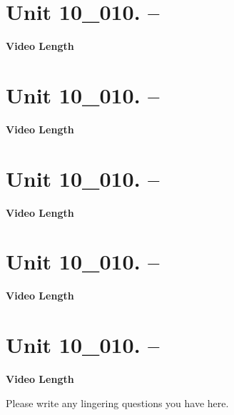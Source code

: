 \documentclass[letterpaper,12pt]{exam}
\newcommand{\unit}{Unit 10}
\begin{document}
\begin{questions}
\section*{\unit\_010. -- } 
\par{\selectfont\textbf{Video Length }}

\section*{\unit\_010. -- } 
\par{\selectfont\textbf{Video Length }}

\section*{\unit\_010. -- } 
\par{\selectfont\textbf{Video Length }}

\section*{\unit\_010. -- } 
\par{\selectfont\textbf{Video Length }}

\section*{\unit\_010. -- } 
\par{\selectfont\textbf{Video Length }}



Please write any lingering questions you have here.


\end{questions}
\end{document}
